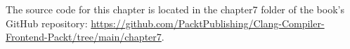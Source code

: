 The source code for this chapter is located in the chapter7 folder of the book's GitHub repository: \url{https://github.com/PacktPublishing/Clang-Compiler-Frontend-Packt/tree/main/chapter7}.
